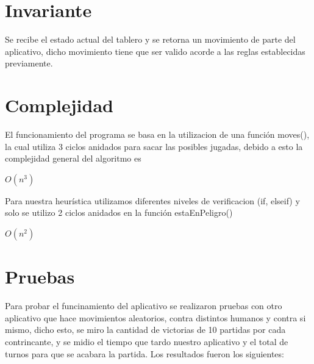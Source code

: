 \documentclass[12pt]{article}
\begin{document}
\section{Invariante}

    Se recibe el estado actual del tablero y se retorna un movimiento de parte del aplicativo, dicho movimiento tiene que ser valido acorde a las reglas establecidas previamente.


\section{Complejidad}

    El funcionamiento del programa se basa en la utilizacion de una función moves(), la cual utiliza 3 ciclos anidados para sacar las posibles jugadas, debido a esto la complejidad general del algoritmo es 
    \State  
    \begin{center}

$O(n^3)$ 

\end{center} 
 
 

    Para nuestra heurística utilizamos diferentes niveles de verificacion (if, elseif) y solo se utilizo 2 ciclos anidados en la función estaEnPeligro()
     \begin{center}
    
    \State $O(n^2)$
    
\end{center} 

\section{Pruebas}

    Para probar el funcinamiento del aplicativo se realizaron pruebas con otro aplicativo que hace movimientos aleatorios, contra distintos humanos y contra si mismo, dicho esto, se miro la cantidad de victorias de 10 partidas por cada contrincante, y se midio el tiempo que tardo nuestro aplicativo y el total de turnos para que se acabara la partida. Los resultados fueron los siguientes: 
\end{document}
